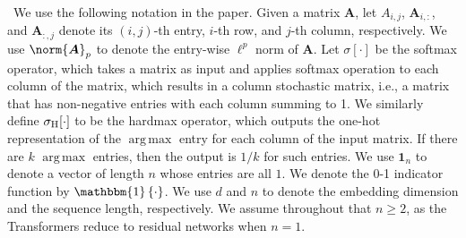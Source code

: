 \documentclass{article} %
\def\vone{{\bm{1}}}
\def\mA{{\bm{A}}}
\def\emA{{A}}
\DeclareMathOperator*{\argmax}{arg\,max}
\newcommand{\sfmx}{\sigma}
\newcommand{\hdmx}{\sigma_{\rm H}}
\renewcommand{\indic}[1]{\mathbbm{1}\left\{#1\right\}}
\begin{document}





~We use the following notation in the paper. Given a matrix $\mA$, let $\emA_{i,j}$, $\mA_{i,:}$, and $\mA_{:, j}$ denote its $(i,j)$-th entry, $i$-th row, and $j$-th column, respectively. We use $\norm{\mA}_p$ to denote the entry-wise $\ell^p$ norm of $\mA$. Let $\sfmx[\cdot]$ be the softmax operator, which takes a matrix as input and applies softmax operation to each column of the matrix, which results in a column stochastic matrix, i.e., a matrix that has non-negative entries with each column summing to 1. We similarly define $\hdmx[\cdot]$ to be the hardmax operator, which outputs the one-hot representation of the $\argmax$ entry for each column of the input matrix. If there are $k$ $\argmax$ entries, then the output is $1/k$ for such entries.
We use $\vone_n$ to denote a vector of length $n$ whose entries are all $1$. We denote the 0-1 indicator function by $\indic{\cdot}$. We use $d$ and $n$ to denote the embedding dimension and the sequence length, respectively. We assume throughout that $n \geq 2$, as the Transformers reduce to residual networks when $n=1$.
\end{document}
